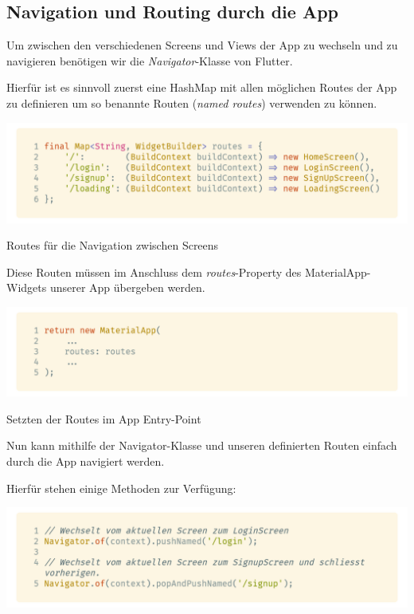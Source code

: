 \subsection{Navigation und Routing durch die App}

Um zwischen den verschiedenen Screens und Views der App zu wechseln und zu navigieren 
benötigen wir die \textit{Navigator}-Klasse von Flutter.

Hierfür ist es sinnvoll zuerst eine HashMap mit allen möglichen Routes der App zu definieren
um so benannte Routen (\textit{named routes}) verwenden zu können.

\begin{code}
    \centering
    \includegraphics[width=1\textwidth]{images/Flutter/flutterRoutes.png}
    \caption{Routes für die Navigation zwischen Screens}
\end{code}

\newpage

Diese Routen müssen im Anschluss dem \textit{routes}-Property des MaterialApp-Widgets unserer App übergeben werden.

\begin{code}
    \centering
    \includegraphics[width=1\textwidth]{images/Flutter/flutterMainRoute.png}
    \caption{Setzten der Routes im App Entry-Point}
\end{code}

Nun kann mithilfe der Navigator-Klasse und unseren definierten Routen einfach durch die App
navigiert werden.

Hierfür stehen einige Methoden zur Verfügung:

\begin{code}
    \centering
    \includegraphics[width=1\textwidth]{images/Flutter/flutterNavigatorOf.png}
    \caption{\lstinline{Navigator.of()}-Funktion zum Wechseln der Screens per \textit{namedRoutes}}
\end{code}

